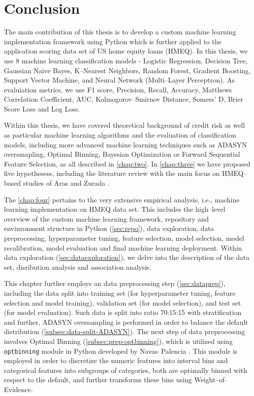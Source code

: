 \chapter{Conclusion}
\label{conclusion}

The main contribution of this thesis is to develop a custom machine learning implementation framework using Python which is further applied to the application scoring data set of US home equity loans (HMEQ).
In this thesis, we use 8 machine learning classification models - Logistic Regression, Decision Tree, Gaussian Naive Bayes, K--Nearest Neighbors, Random Forest, Gradient Boosting, Support Vector Machine, and Neural Network (Multi--Layer Perceptron). As evaluiation metrics, we use F1 score, Precision, Recall, Accuracy, Matthews Correlation Coefficient, AUC, Kolmogorov--Smirnov Distance, Somers' D, Brier Score Loss and Log Loss.

Within this thesis, we have covered theoretical background of credit risk as well as particular machine learning algorithms and the evaluation of classification models, including more advanced machine learning techniques such as ADASYN oversmapling, Optimal Binning, Bayesian Optimization or Forward Sequential Feature Selection, as all described in \autoref{chap:two}.
In \autoref{chap:three} we have proposed five hypothesess, including the literature review with the main focus on HMEQ--based studies of Aras \citep{serkan2021bagging} and Zurada \citep{zurada2014classification}.

The \autoref{chap:four} pertains to the very extensive empirical analysis, i.e., machine learning implementation on HMEQ data set.  This includes the high--level overview of the custom machine learning framework, repository and envinronment structure in Python (\autoref{sec:repo}), data exploration, data preprocessing, hyperparameter tuning, feature selection, model selection, model recalibration, model evaluation and final machine learning deployment.
Within data exploration (\autoref{sec:dataexploration}), we delve into the description of the data set, disribution analysis and association analysis.

This chapter further employs an data preprocessing step (\autoref{sec:dataprep}), including the data split into training set (for hyperparameter tuning, feature selection and model training), validation set (for model selection), and test set (for model evaluation).
Such data is split into ratio 70:15:15 with stratification and further, ADASYN oversampling is performed in order to balance the default distribution (\autoref{subsec:data-split-ADASYN}).
The next step of data preprocessing involves Optimal Binning (\autoref{subsec:prep-optbinning}), which is utilized using \lstinline{optbinning} module in Python developed by Navas--Palencia \citep{navas2020optimal}. This module is employed in order to discretize the numeric features into interval bins and categorical features into subgroups of categories, both are optimally binned with respect to the default, and further transforms these bins using Weight--of--Evidence.


